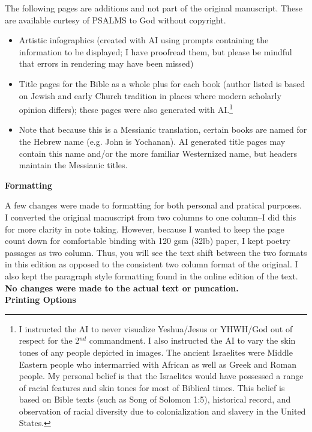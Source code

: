 The following pages are additions and not part of the original manuscript. These are available curtesy of PSALMS to God without copyright.
 \begin{itemize}
	\item  Artistic infographics (created with AI using prompts containing the information to be displayed; I have proofread them, but please be mindful that errors in rendering may have been missed)
	\item  Title pages for the Bible as a whole plus for each book (author listed is based on Jewish and early Church tradition in places where modern scholarly opinion differs); these pages were also generated with AI.\footnote{I instructed the AI to never visualize Yeshua/Jesus or YHWH/God out of respect for the 2$^{nd}$ commandment. I also instructed the AI to vary the skin tones of any people depicted in images. The ancient Israelites were Middle Eastern people who intermarried with African as well as Greek and Roman people. My personal belief is that the Israelites would have possessed a range of racial features and skin tones for most of Biblical times. This belief is based on Bible texts (such as Song of Solomon 1:5), historical record, and observation of racial diversity due to colonialization and slavery in the United States.}
	\item Note that because this is a Messianic translation, certain books are named for the Hebrew name (e.g. John is Yochanan). AI generated title pages may contain this name and/or the more familiar Westernized name, but headers maintain the Messianic titles.
\end{itemize}
\vspace{\baselineskip}

\textbf{Formatting}

A few changes were made to formatting for both personal and pratical purposes. I converted the original manuscript from two columns to one column--I did this for more clarity in note taking. However, because I wanted to keep the page count down for comfortable binding with 120 gsm (32lb) paper, I kept poetry passages as two column. Thus, you will see the text shift between the two formats in this edition as opposed to the consistent two column format of the original. I also kept the paragraph style formatting found in the online edition of the text. \textbf{No changes were made to the actual text or puncation.}\\

\textbf{Printing Options}

